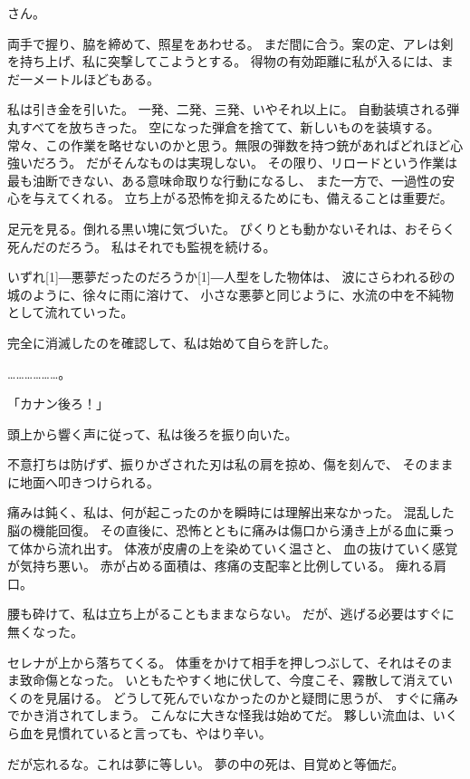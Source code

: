 \documentclass[../IHMain]{subfiles}
\begin{document}
さん。

両手で握り、脇を締めて、照星をあわせる。
まだ間に合う。案の定、アレは剣を持ち上げ、私に突撃してこようとする。
得物の有効距離に私が入るには、まだ一メートルほどもある。

私は引き金を引いた。
一発、二発、三発、いやそれ以上に。
自動装填される弾丸すべてを放ちきった。
空になった弾倉を捨てて、新しいものを装填する。
常々、この作業を略せないのかと思う。無限の弾数を持つ銃があればどれほど心強いだろう。
だがそんなものは実現しない。
その限り、リロードという作業は最も油断できない、ある意味命取りな行動になるし、
また一方で、一過性の安心を与えてくれる。
立ち上がる恐怖を抑えるためにも、備えることは重要だ。

足元を見る。倒れる黒い塊に気づいた。
ぴくりとも動かないそれは、おそらく死んだのだろう。
私はそれでも監視を続ける。

いずれ\scalebox{3}[1]{―}悪夢だったのだろうか\scalebox{3}[1]{―}人型をした物体は、
波にさらわれる砂の城のように、徐々に雨に溶けて、
小さな悪夢と同じように、水流の中を不純物として流れていった。

完全に消滅したのを確認して、私は始めて自らを許した。

………………。

「カナン後ろ！」

頭上から響く声に従って、私は後ろを振り向いた。

不意打ちは防げず、振りかざされた刃は私の肩を掠め、傷を刻んで、
そのままに地面へ叩きつけられる。

痛みは鈍く、私は、何が起こったのかを瞬時には理解出来なかった。
混乱した脳の機能回復。
その直後に、恐怖とともに痛みは傷口から湧き上がる血に乗って体から流れ出す。
体液が皮膚の上を染めていく温さと、
血の抜けていく感覚が気持ち悪い。
赤が占める面積は、疼痛の支配率と比例している。
痺れる肩口。

腰も砕けて、私は立ち上がることもままならない。
だが、逃げる必要はすぐに無くなった。

セレナが上から落ちてくる。
体重をかけて相手を押しつぶして、それはそのまま致命傷となった。
いともたやすく地に伏して、今度こそ、霧散して消えていくのを見届ける。
どうして死んでいなかったのかと疑問に思うが、
すぐに痛みでかき消されてしまう。
こんなに大きな怪我は始めてだ。
夥しい流血は、いくら血を見慣れていると言っても、やはり辛い。

だが忘れるな。これは夢に等しい。
夢の中の死は、目覚めと等価だ。
\end{document}
